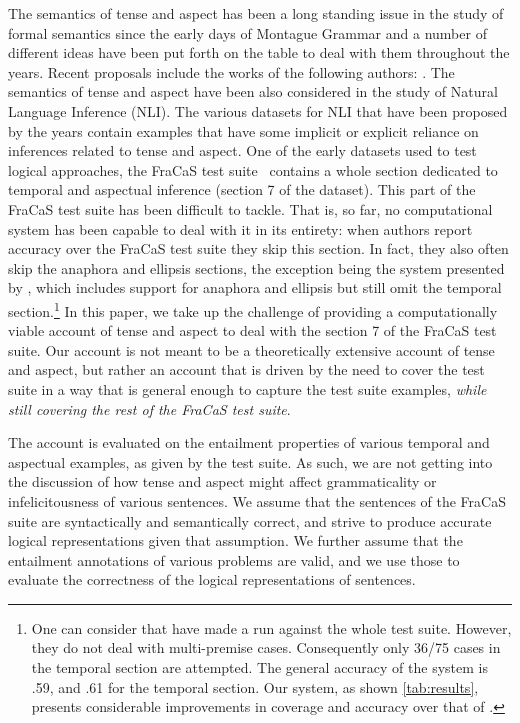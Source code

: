 \documentclass[11pt,a4paper]{article}
\begin{document}
The semantics of tense and aspect has been a long standing issue in
the study of formal semantics since the early days of Montague Grammar
and a number of different ideas have been put forth on the table to
deal with them throughout the years. Recent proposals include the
works of the following authors:
\citet{dowty:2012,prior:2003,steedman_productions_2000,higginbotham:2009,fernando:2015}.
%
The
semantics of tense and aspect have been also considered in the study of
Natural Language Inference (NLI). The various datasets
for NLI that have been proposed by the years contain examples that
have some implicit or explicit reliance on inferences related to tense
and aspect. One of the early datasets used to test logical approaches,
the FraCaS test suite~\citep{cooper:1996} contains a whole section
dedicated to temporal and aspectual inference (section 7 of the dataset). This part
of the FraCaS test suite has been difficult to tackle. That is,
so far, no computational system has been capable to deal with it in its entirety: when
authors report accuracy over the FraCaS test suite they
skip this section.
%
In fact, they also often skip the anaphora and ellipsis sections, the
exception being the system presented by
\citet{bernardy_type-theoretical_2017,bernardy_wide-coverage_2019},
which includes support for anaphora and ellipsis but still omit the
temporal section.\footnote{One can consider that \citet{maccartney:2007} have made a run against the whole test suite. However, they do not deal with multi-premise cases. Consequently only 36/75 cases in the temporal section are attempted. The general accuracy of the system is .59, and .61 for the temporal section. Our system, as shown \cref{tab:results}, presents considerable improvements in coverage and accuracy over that of \citeauthor{maccartney:2007}.}
%
In this paper, we take up the challenge of providing a
computationally viable account of tense and aspect to deal with the
  section 7 of the FraCaS test suite. Our account is not meant
to be a theoretically extensive account of tense and aspect, but rather an
account that is driven by the need to cover the test suite in a way
that is general enough to capture the test suite examples, \emph{while still covering the rest of the FraCaS test suite}.
%

The account is evaluated on the entailment properties of various
temporal and aspectual examples, as given by the test suite. As such,
we are not getting into the discussion of how tense and aspect might
affect grammaticality or infelicitousness of various sentences.
We assume that the sentences of the FraCaS suite are syntactically and
semantically correct, and strive to produce accurate logical
representations given that assumption. We further assume that the
entailment annotations of various problems are valid, and we use those
to evaluate the correctness of the logical representations of
sentences.
\end{document}
